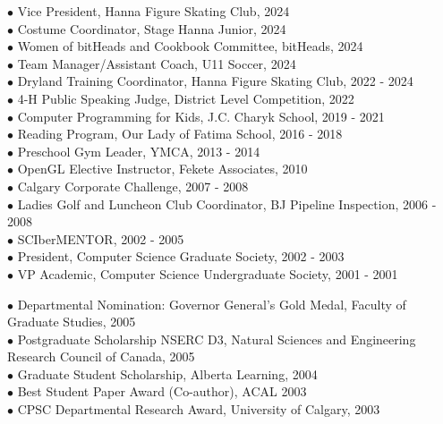 \documentclass[9pt]{developercv} %
\begin{document}
$\bullet$ Vice President, Hanna Figure Skating Club, 2024
\\ $\bullet$ Costume Coordinator, Stage Hanna Junior, 2024
\\ $\bullet$ Women of bitHeads and Cookbook Committee, bitHeads, 2024 
\\ $\bullet$ Team Manager/Assistant Coach, U11 Soccer, 2024
\\ $\bullet$ Dryland Training Coordinator, Hanna Figure Skating Club, 2022 - 2024
\\ $\bullet$ 4-H Public Speaking Judge, District Level Competition, 2022
\\ $\bullet$ Computer Programming for Kids, J.C. Charyk School, 2019 - 2021
\\ $\bullet$ Reading Program, Our Lady of Fatima School, 2016 - 2018
\\ $\bullet$ Preschool Gym Leader, YMCA,  2013 - 2014
\\ $\bullet$ OpenGL Elective Instructor, Fekete Associates, 2010
\\ $\bullet$ Calgary Corporate Challenge, 2007 - 2008
\\ $\bullet$ Ladies Golf and Luncheon Club Coordinator, BJ Pipeline Inspection, 2006 - 2008 
\\ $\bullet$ SCIberMENTOR, 2002 - 2005
\\ $\bullet$ President, Computer Science Graduate Society, 2002 - 2003
\\ $\bullet$ VP Academic, Computer Science Undergraduate Society, 2001 - 2001


$\bullet$ Departmental Nomination: Governor General's Gold Medal, Faculty of Graduate Studies, 2005
\\ $\bullet$ Postgraduate Scholarship NSERC D3, Natural Sciences and Engineering Research Council of Canada, 2005
\\ $\bullet$ Graduate Student Scholarship, Alberta Learning, 2004
\\ $\bullet$ Best Student Paper Award (Co-author), ACAL 2003
\\ $\bullet$ CPSC Departmental Research Award, University of Calgary, 2003
\end{document}
